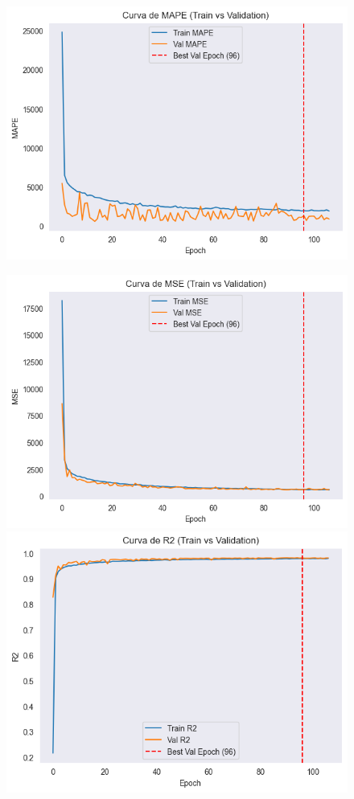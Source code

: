 \begin{figure}[H]
\begin{minipage}{0.48\textwidth}
		\includegraphics[width=\linewidth]{includes/cap5/graphs/sid2_trafficformer_mape.png}
	\end{minipage}
	\hfill
	\begin{minipage}{0.48\textwidth}
		\centering
		\includegraphics[width=\linewidth]{includes/cap5/graphs/sid2_trafficformer_mse.png}
		\vspace{0.2cm}
		\includegraphics[width=\linewidth]{includes/cap5/graphs/sid2_trafficformer_r2.png}

\end{minipage}
\end{figure}
